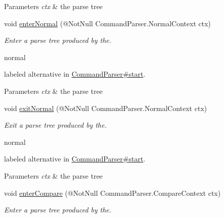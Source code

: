 \begin{DoxyCompactItemize}
\begin{DoxyCompactList}
\begin{DoxyParams}{Parameters}
{\em ctx} & the parse tree\\
\hline
\end{DoxyParams}
 \end{DoxyCompactList}\item 
void \hyperlink{classedu_1_1udel_1_1cis_1_1vsl_1_1civl_1_1run_1_1common_1_1CommandBaseListener_acc4b2a713bf655bc131cf1986ad59120}{enter\+Normal} (@Not\+Null Command\+Parser.\+Normal\+Context ctx)
\begin{DoxyCompactList}\small\item\em Enter a parse tree produced by the.


\begin{DoxyCode}
normal 
\end{DoxyCode}
 labeled alternative in \hyperlink{}{Command\+Parser\#start}. 
\begin{DoxyParams}{Parameters}
{\em ctx} & the parse tree\\
\hline
\end{DoxyParams}
 \end{DoxyCompactList}\item 
void \hyperlink{classedu_1_1udel_1_1cis_1_1vsl_1_1civl_1_1run_1_1common_1_1CommandBaseListener_aebe5f1972eb22756e65152226389891a}{exit\+Normal} (@Not\+Null Command\+Parser.\+Normal\+Context ctx)
\begin{DoxyCompactList}\small\item\em Exit a parse tree produced by the.


\begin{DoxyCode}
normal 
\end{DoxyCode}
 labeled alternative in \hyperlink{}{Command\+Parser\#start}. 
\begin{DoxyParams}{Parameters}
{\em ctx} & the parse tree\\
\hline
\end{DoxyParams}
 \end{DoxyCompactList}\item 
void \hyperlink{classedu_1_1udel_1_1cis_1_1vsl_1_1civl_1_1run_1_1common_1_1CommandBaseListener_a0913b4c288ed0c9caddcb1e40fde2882}{enter\+Compare} (@Not\+Null Command\+Parser.\+Compare\+Context ctx)
\begin{DoxyCompactList}\small\item\em Enter a parse tree produced by the.



\end{DoxyCompactList}
\end{DoxyCompactItemize}
